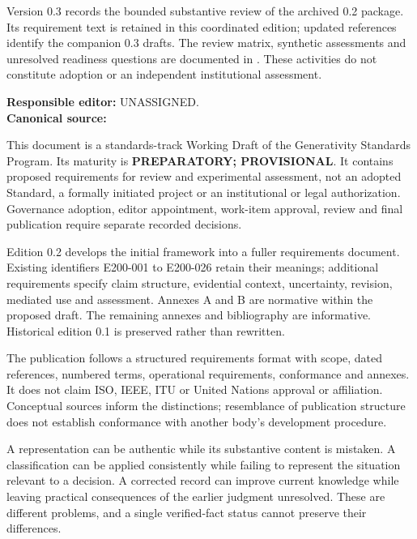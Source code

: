 \documentclass[11pt,a4paper]{article}
\begin{document}
\GSPfrontmatter
{}
Version 0.3 records the bounded substantive review of the archived 0.2 package. Its requirement text is retained in this coordinated edition; updated references identify the companion 0.3 drafts. The review matrix, synthetic assessments and unresolved readiness questions are documented in . These activities do not constitute adoption or an independent institutional assessment.

\noindent\textbf{Responsible editor:} UNASSIGNED.\\
\textbf{Canonical source:} 

This document is a standards-track Working Draft of the Generativity Standards Program. Its maturity is \textbf{PREPARATORY; PROVISIONAL}. It contains proposed requirements for review and experimental assessment, not an adopted Standard, a formally initiated project or an institutional or legal authorization. Governance adoption, editor appointment, work-item approval, review and final publication require separate recorded decisions.

Edition 0.2 develops the initial framework into a fuller requirements document. Existing identifiers E200-001 to E200-026 retain their meanings; additional requirements specify claim structure, evidential context, uncertainty, revision, mediated use and assessment. Annexes A and B are normative within the proposed draft. The remaining annexes and bibliography are informative. Historical edition 0.1 is preserved rather than rewritten.

The publication follows a structured requirements format with scope, dated references, numbered terms, operational requirements, conformance and annexes. It does not claim ISO, IEEE, ITU or United Nations approval or affiliation. Conceptual sources inform the distinctions; resemblance of publication structure does not establish conformance with another body's development procedure.

\tableofcontents\clearpage
{}
A representation can be authentic while its substantive content is mistaken. A classification can be applied consistently while failing to represent the situation relevant to a decision. A corrected record can improve current knowledge while leaving practical consequences of the earlier judgment unresolved. These are different problems, and a single verified-fact status cannot preserve their differences.
\end{document}
